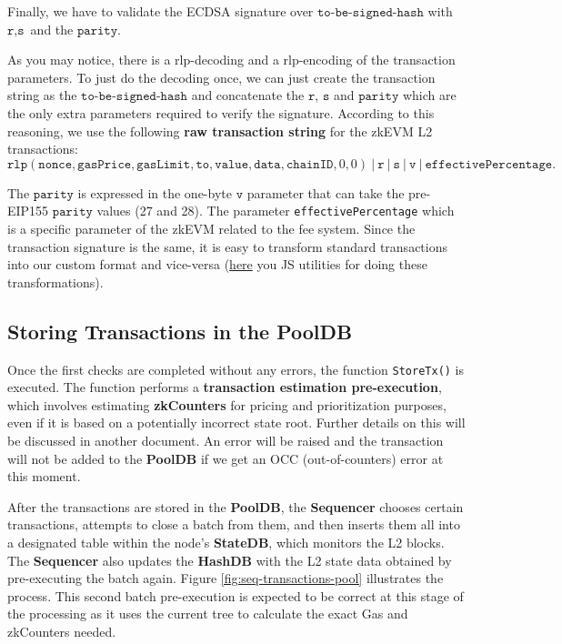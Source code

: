 Finally, we have to validate the ECDSA signature over $\texttt{to-be-signed-hash}$ with $\texttt{r}, \texttt{s}$ and the $\texttt{parity}$.

As you may notice, there is a rlp-decoding and a rlp-encoding of the transaction parameters. To just do the decoding once, we can just create the transaction string as the $\texttt{to-be-signed-hash}$ and concatenate the $\texttt{r}$, $\texttt{s}$ and $\texttt{parity}$ which are the only extra parameters required to verify the signature. According to this reasoning, we use the following \textbf{raw transaction string} for the zkEVM L2 transactions:
{
\small
\[
\texttt{rlp}(\texttt{nonce}, \texttt{gasPrice}, \texttt{gasLimit}, \texttt{to}, \texttt{value}, \texttt{data}, \texttt{chainID}, 0, 0) \ | \ \texttt{r} \ | \ \texttt{s} \ | \ \texttt{v} \ | \ \texttt{effectivePercentage}.
\]
}

The $\texttt{parity}$ is expressed in the one-byte $\texttt{v}$ parameter that can take the pre-EIP155 $\texttt{parity}$ values (27 and 28). The parameter \texttt{effectivePercentage} which is a specific parameter of the zkEVM related to the fee system. Since the transaction signature is the same, it is easy to transform standard transactions into our custom format and vice-versa (\href{https://github.com/0xPolygonHermez/zkevm-commonjs/blob/main/src/processor-utils.js}{here} you JS utilities for doing these transformations).


\subsection{Storing Transactions in the \textbf{PoolDB}}

Once the first checks are completed without any errors, the function \texttt{StoreTx()} is executed. The function performs a \textbf{transaction estimation pre-execution}, which involves estimating \textbf{zkCounters} for pricing and prioritization purposes, even if it is based on a potentially incorrect state root. Further details on this will be discussed in another document. An error will be raised and the transaction will not be added to the \textbf{PoolDB} if we get an OCC (out-of-counters) error at this moment.

After the transactions are stored in the \textbf{PoolDB}, the \textbf{Sequencer} chooses certain transactions, attempts to close a batch from them, and then inserts them all into a designated table within the node's \textbf{StateDB}, which monitors the L2 blocks. The \textbf{Sequencer} also updates the \textbf{HashDB} with the L2 state data obtained by pre-executing the batch again. Figure \ref{fig:seq-transactions-pool} illustrates the process. This second batch pre-execution is expected to be correct at this stage of the processing as it uses the current tree to calculate the exact Gas and zkCounters needed.

